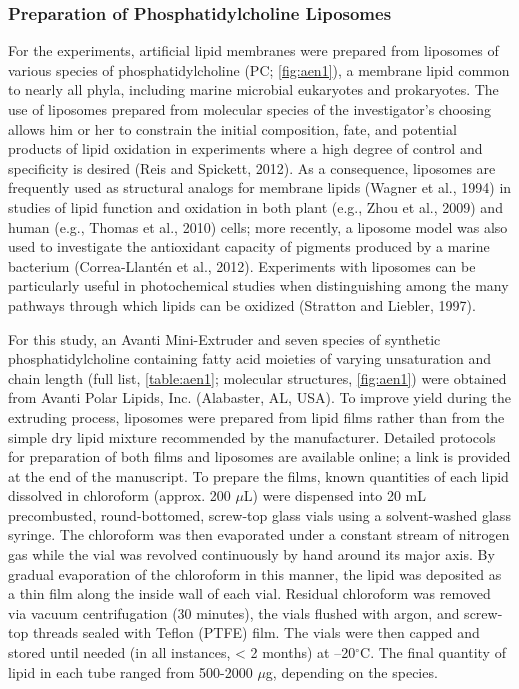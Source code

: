 \subsubsection{Preparation of Phosphatidylcholine Liposomes}

For the experiments, artificial lipid membranes were prepared from liposomes of various species of phosphatidylcholine (PC; \autoref{fig:aen1}), a membrane lipid common to nearly all phyla, including marine microbial eukaryotes and prokaryotes. The use of liposomes prepared from molecular species of the investigator's choosing allows him or her to constrain the initial composition, fate, and potential products of lipid oxidation in experiments where a high degree of control and specificity is desired (Reis and Spickett, 2012). As a consequence, liposomes are frequently used as structural analogs for membrane lipids (Wagner et al., 1994) in studies of lipid function and oxidation in both plant (e.g., Zhou et al., 2009) and human (e.g., Thomas et al., 2010) cells; more recently, a liposome model was also used to investigate the antioxidant capacity of pigments produced by a marine bacterium (Correa-Llant\'{e}n et al., 2012). Experiments with liposomes can be particularly useful in photochemical studies when distinguishing among the many pathways through which lipids can be oxidized (Stratton and Liebler, 1997).

For this study, an Avanti Mini-Extruder and seven species of synthetic phosphatidylcholine containing fatty acid moieties of varying unsaturation and chain length (full list, \autoref{table:aen1}; molecular structures, \autoref{fig:aen1}) were obtained from Avanti Polar Lipids, Inc. (Alabaster, AL, USA). To improve yield during the extruding process, liposomes were prepared from lipid films rather than from the simple dry lipid mixture recommended by the manufacturer. Detailed protocols for preparation of both films and liposomes are available online; a link is provided at the end of the manuscript. To prepare the films, known quantities of each lipid dissolved in chloroform (approx. 200 $\mu$L) were dispensed into 20 mL precombusted, round-bottomed, screw-top glass vials using a solvent-washed glass syringe. The chloroform was then evaporated under a constant stream of nitrogen gas while the vial was revolved continuously by hand around its major axis. By gradual evaporation of the chloroform in this manner, the lipid was deposited as a thin film along the inside wall of each vial. Residual chloroform was removed via vacuum centrifugation (30 minutes), the vials flushed with argon, and screw-top threads sealed with Teflon (PTFE) film. The vials were then capped and stored until needed (in all instances, \textless{} 2 months) at --20$^{\circ}$C. The final quantity of lipid in each tube ranged from 500-2000 $\mu$g, depending on the species.

